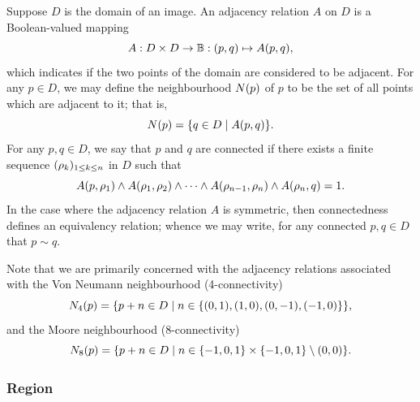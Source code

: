 \documentclass{article}
\begin{document}
Suppose $D$ is the domain of an image.
An adjacency relation $A$ on $D$ is a Boolean-valued mapping
\begin{equation}
  \label{eq:def-adjacency}
  A
  :
  D \times D \to \mathbb{B}
  :
  (p, q)
  \mapsto
  A(p, q)
  ,
\end{equation}
which indicates if the two points of the domain are considered to be adjacent.
For any $p \in D$, we may define the neighbourhood $N(p)$ of $p$ to be the
set of all points which are adjacent to it; that is,
\begin{equation}
  \label{eq:def-neighbourhood}
  N(p)
  =
  \lbrace
    q \in D
    \mid
    A(p, q)
  \rbrace
  .
\end{equation}
For any $p, q \in D$, we say that $p$ and $q$ are connected if there exists a
finite sequence $(\rho_{k})_{1 \leq k \leq n}$ in $D$ such that
\begin{equation}
  \label{eq:def-connected}
  A(p, \rho_{1})
  \wedge
  A(\rho_{1}, \rho_{2})
  \wedge
  \dotsb
  \wedge
  A(\rho_{n-1}, \rho_{n})
  \wedge
  A(\rho_{n}, q)
  =
  1
  .
\end{equation}
In the case where the adjacency relation $A$ is symmetric, then connectedness
defines an equivalency relation; whence we may write, for any connected
$p, q \in D$ that $p \sim q$.

Note that we are primarily concerned with the adjacency relations associated
with the Von Neumann neighbourhood (4-connectivity)
\begin{equation}
  \label{eq:def-neighbourhood-4}
  N_{4}(p)
  =
  \lbrace
    p + n \in D
    \mid
    n
    \in
    \lbrace
      (0, 1)
      ,
      (1, 0)
      ,
      (0, -1)
      ,
      (-1, 0)
    \rbrace
  \rbrace
  ,
\end{equation}
and the Moore neighbourhood (8-connectivity)
\begin{equation}
  \label{eq:def-neighbourhood-8}
  N_{8}(p)
  =
  \lbrace
    p + n \in D
    \mid
    n
    \in
    \lbrace-1, 0, 1\rbrace \times \lbrace-1, 0, 1\rbrace
    \setminus (0, 0)
  \rbrace
  .
\end{equation}

\subsubsection*{Region}
\end{document}
